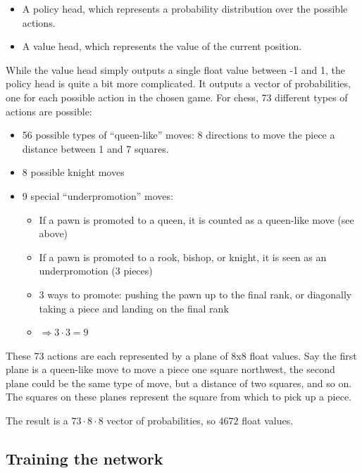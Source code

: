 \documentclass{article}
\begin{document}
\begin{itemize}
    \item A policy head, which represents a probability distribution over the possible actions.
    \item A value head, which represents the value of the current position.
\end{itemize}

While the value head simply outputs a single float value between -1 and 1, the policy head is quite a bit more complicated.
It outputs a vector of probabilities, one for each possible action in the chosen game. 
For chess, 73 different types of actions are possible:

\begin{itemize}
    \item 56 possible types of ``queen-like'' moves: 8 directions to move the piece a distance between 1 and 7 squares.
    \item 8 possible knight moves
    \item 9 special ``underpromotion'' moves:
    \begin{itemize}
        \item If a pawn is promoted to a queen, it is counted as a queen-like move (see above)
        \item If a pawn is promoted to a rook, bishop, or knight, it is seen as an underpromotion (3 pieces)
        \item 3 ways to promote: pushing the pawn up to the final rank, or diagonally taking a piece and landing on the final rank
        \item $\Rightarrow 3 \cdot 3 = 9$
    \end{itemize}
\end{itemize}

These 73 actions are each represented by a plane of 8x8 float values. Say the first plane is a queen-like move
to move a piece one square northwest, the second plane could be the same type of move, but a distance of two squares, and so on.
The squares on these planes represent the square from which to pick up a piece. 


The result is a $73 \cdot 8 \cdot 8$ vector of probabilities, so $4672$ float values.  

\subsection{Training the network}
\end{document}
